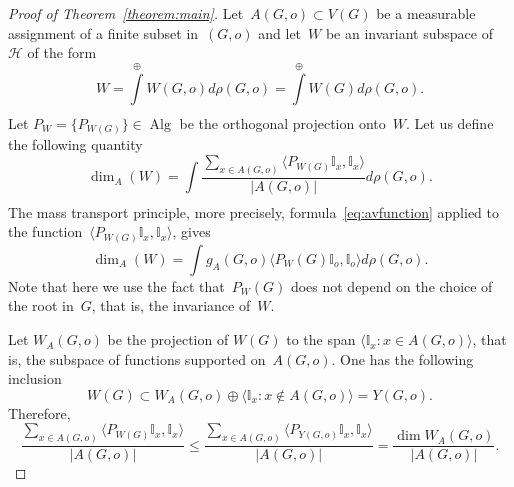 \documentclass[english]{article}
\theoremstyle{definition}
\DeclareMathOperator{\Alg}{Alg} %
\DeclareMathOperator{\Gr}{{\mathcal{G}_*}}
\begin{document}
\begin{proof}[Proof of Theorem~\ref{theorem:main}]
    Let~$A(G,o) \subset V(G)$ be a measurable assignment of a finite subset in~$(G,o)$ and %
    let~$W$ be an { invariant} subspace of~$\mathcal{H}$ of the form 
    $$
    W = \int\limits^{\oplus}_{\Gr} W{(G,o)} d \rho(G,o)  = \int\limits^{\oplus}_{\Gr} W{(G)} d \rho(G,o).
    $$
    Let $P_W = \{P_{W(G)}\} \in \Alg$ be the orthogonal projection onto~$W$. Let us define the following quantity 
    $$
    \dim_A (W) = \int\limits_{\Gr} \frac{\sum_{x \in A(G,o)} \langle P_{W(G)} \mathbb I _x , \mathbb I _x\rangle}{|A(G,o)|} d \rho(G,o).
    $$
    The mass transport principle, more precisely, formula~\eqref{eq:avfunction} applied to the function~$\langle P_{W(G)} \mathbb I _x , \mathbb I _x\rangle$, gives
    $$
    \dim_A(W) = \int g_A(G,o) \langle P_W(G)\mathbb I_o, \mathbb I_o\rangle d \rho(G,o).
    $$
    Note that here we use the fact that~$P_W(G)$ does not depend on the choice of the root in~$G$, that is, the invariance of~$W$.
    
    Let $W_A(G,o)$ be the projection of $W(G)$ to the span $\langle \mathbb I_x \colon x\in A(G,o)\rangle$, that is, the subspace of functions supported on~$A(G,o)$. One has the following inclusion  
    $$
    W{(G)} \subset  W_A(G,o) \oplus \langle \mathbb I_x \colon x\not \in A(G,o)\rangle = Y(G,o).
    $$
    Therefore, 
    \begin{equation}\label{eq_proofthm1_1}
        \frac{\sum_{x \in A(G,o)} \langle P_{W(G)} \mathbb I _x , \mathbb I _x\rangle}{|A(G,o)|} \le 
    \frac{\sum_{x \in A(G,o)} \langle P_{Y(G,o)} \mathbb I _x , \mathbb I _x\rangle}{|A(G,o)|} =
    \frac{\dim W_A (G,o)}{|A(G,o)|}.
    \end{equation}


\end{proof}
\end{document}
